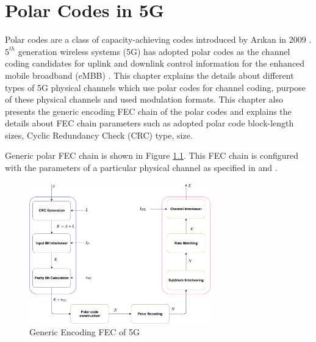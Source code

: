\chapter{Polar Codes in 5G} \label{polarCodes}
Polar codes are a class of capacity-achieving codes introduced by Ar\i kan in 2009 \cite{Arikan}. $ 5^{th} $ generation wireless systems (5G) has adopted polar codes as the channel coding candidates for uplink and downlink control information for the enhanced mobile broadband (eMBB) \cite{3gpp.38.212}. This chapter explains the details about different types of 5G physical channels which use polar codes for channel coding, purpose of these physical channels and used modulation formats. This chapter also presents the generic encoding FEC chain of the polar codes and explains the details about FEC chain parameters such as adopted polar code block-length sizes, Cyclic Redundancy Check (CRC) type, size.

Generic polar FEC chain is shown in Figure \ref{fig:Generic5gtx_fec_chain}. This FEC chain is configured with the parameters of a particular physical channel as specified in \cite{3gpp.38.212} and \cite{3gpp.38.211}.

\begin{figure}[!h]
	\centering
	\includegraphics[width=0.7\textwidth]{./figures/Generic5GFECchain.pdf}
	\caption{Generic Encoding FEC of 5G}
	\label{fig:Generic5gtx_fec_chain}
\end{figure}

